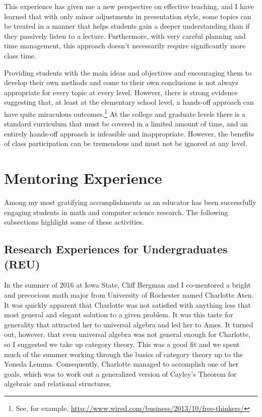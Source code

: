 This experience has given me a new perspective on effective teaching, and I have learned that with only minor adjustments in presentation style, some topics can be treated in a manner that helps students gain a deeper understanding than if they passively listen to a lecture. Furthermore, with very careful planning and time management, this approach doesn't necessarily require significantly more class time.

Providing students with the main ideas and objectives and encouraging them to develop their own methods and come to their own conclusions is not always appropriate for every topic at every level.  However, there is strong evidence suggesting that, at least at the elementary school level, a hands-off approach can have quite miraculous outcomes.\footnote{See, for example, \url{http://www.wired.com/business/2013/10/free-thinkers/}} At the college and graduate levels there is a standard curriculum that must be covered in a limited amount of time, and an entirely hands-off approach is infeasible and inappropriate.  However, the benefits of class participation can be tremendous and must not be ignored at any level.


\newpage

\pagestyle{fancy}\chead{} 
 \lfoot{} \rfoot{\thepage} \cfoot{}

\section{Mentoring Experience} Among my most gratifying accomplishments as an educator has been successfully engaging students in math and computer science research. The following subsections highlight some of these activities.

\newcommand{\advisee}[1]{#1}

\bigskip

\subsection{Research Experiences for Undergraduates (REU)}
In the summer of 2016 at Iowa State, Cliff Bergman and I co-mentored a bright and precocious math major from University of Rochester named \advisee{Charlotte Aten}.  It was quickly apparent that Charlotte was not satisfied with anything less that most general and elegant solution to a given problem. It was this taste for generality that attracted her to universal algebra and led her to Ames. It turned out, however, that even universal algebra was not general enough for Charlotte, so I suggested we take up category theory.  This was a good fit and we spent much of the summer working through the basics of category theory up to the Yoneda Lemma. Consequently, Charlotte managed to accomplish one of her goals, which was to work out a generalized version of Cayley's Theorem for algebraic and relational structures.  

